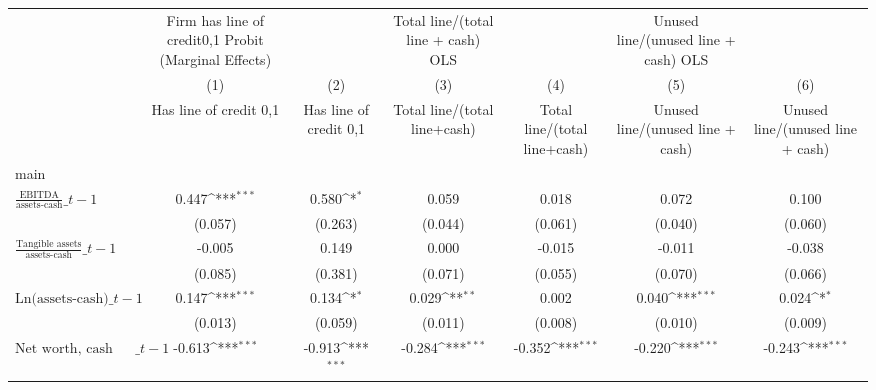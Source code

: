 {
\def\sym#1{\ifmmode^{#1}\else\(^{#1}\)\fi}
\begin{tabular}{l*{6}{c}}
\toprule
                    &Firm has line of credit{0,1} Probit (Marginal Effects)         &                     &Total line/(total line + cash) OLS         &                     &Unused line/(unused line + cash) OLS         &                     \\
                    &\multicolumn{1}{c}{(1)}&\multicolumn{1}{c}{(2)}&\multicolumn{1}{c}{(3)}&\multicolumn{1}{c}{(4)}&\multicolumn{1}{c}{(5)}&\multicolumn{1}{c}{(6)}\\
                    &\multicolumn{1}{c}{Has line of credit {0,1}}&\multicolumn{1}{c}{Has line of credit {0,1}}&\multicolumn{1}{c}{Total line/(total line+cash)}&\multicolumn{1}{c}{Total line/(total line+cash)}&\multicolumn{1}{c}{Unused line/(unused line + cash)}&\multicolumn{1}{c}{Unused line/(unused line + cash)}\\
\midrule
main                &                     &                     &                     &                     &                     &                     \\
$\frac{\text{EBITDA}}{\text{assets-cash}}\_{t-1}$&       0.447\sym{***}&       0.580\sym{*}  &       0.059         &       0.018         &       0.072         &       0.100         \\
                    &     (0.057)         &     (0.263)         &     (0.044)         &     (0.061)         &     (0.040)         &     (0.060)         \\
\addlinespace
$\frac{\text{Tangible assets}}{\text{assets-cash}}\_{t-1}$&      -0.005         &       0.149         &       0.000         &      -0.015         &      -0.011         &      -0.038         \\
                    &     (0.085)         &     (0.381)         &     (0.071)         &     (0.055)         &     (0.070)         &     (0.066)         \\
\addlinespace
$\text{Ln(assets-cash)}\_{t-1}$&       0.147\sym{***}&       0.134\sym{*}  &       0.029\sym{**} &       0.002         &       0.040\sym{***}&       0.024\sym{*}  \\
                    &     (0.013)         &     (0.059)         &     (0.011)         &     (0.008)         &     (0.010)         &     (0.009)         \\
\addlinespace
$\text{Net worth, cash adjusted}\_{t-1}$&      -0.613\sym{***}&      -0.913\sym{***}&      -0.284\sym{***}&      -0.352\sym{***}&      -0.220\sym{***}&      -0.243\sym{***}\\

\end{tabular}}
